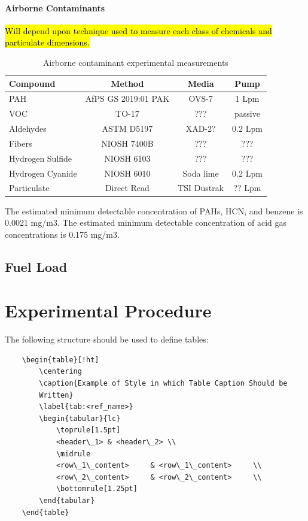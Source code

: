 \documentclass[12pt,oneside]{book}
\begin{document}
\subsubsection*{Airborne Contaminants}
\hl{Will depend upon technique used to measure each class of chemicals and particulate dimensions.} 


\begin{table}[!ht]
	\centering
	\caption{Airborne contaminant experimental measurements}
	\begin{tabular}{lccc}
		\toprule[1.5pt]
		Compound & Method & Media & Pump \\
		\midrule
		PAH   				& AfPS GS 2019:01 PAK   & OVS-7     	& 1 Lpm     \\
		VOC    				& TO-17     			& ???	 		& passive    \\
		Aldehydes   	 	& ASTM D5197		    & XAD-2?   		& 0.2 Lpm    \\
		Fibers    			& NIOSH 7400B      		& ???    		& ???   \\
		Hydrogen Sulfide  	& NIOSH 6103		    & ???    		& ???    \\
		Hydrogen Cyanide   	& NIOSH 6010		    & Soda lime		& 0.2 Lpm    \\
		Particulate   		& Direct Read     		& TSI Dustrak 	& ?? Lpm    \\
		\bottomrule[1.25pt]
	\end{tabular}
\end{table}
The estimated minimum detectable concentration of PAHs, HCN, and benzene  is  0.0021 mg/m3.
The estimated minimum detectable concentration of acid gas concentrations is 0.175 mg/m3.


\section{Fuel Load}

\chapter{Experimental Procedure}
\label{chap:exp_procedure}

The following structure should be used to define tables:
\begin{verbatim}
	\begin{table}[!ht]
	    \centering
	    \caption{Example of Style in which Table Caption Should be 
        Written}
	    \label{tab:<ref_name>}
	    \begin{tabular}{lc}
	        \toprule[1.5pt]
	        <header\_1> & <header\_2> \\
	        \midrule
	        <row\_1\_content>     & <row\_1\_content>     \\
	        <row\_2\_content>     & <row\_2\_content>     \\
	        \bottomrule[1.25pt]
	    \end{tabular}
	\end{table}
\end{verbatim}
\end{document}
